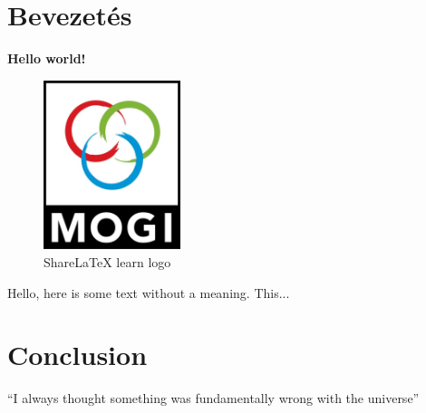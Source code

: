 \documentclass[../main.tex]{subfiles}
\begin{document}
\section{Bevezetés}

\textbf{Hello world!}
 
\begin{figure}[bh]
\centering
\includegraphics[width=4cm]{resources/mogi.png}
 
\label{fig:img1}
\caption{ShareLaTeX learn logo}
\end{figure}
 
Hello, here is some text without a meaning.  This... 
\section{Conclusion}
``I always thought something was fundamentally wrong with the universe'' \citep{adams1995hitchhiker}
\end{document}
